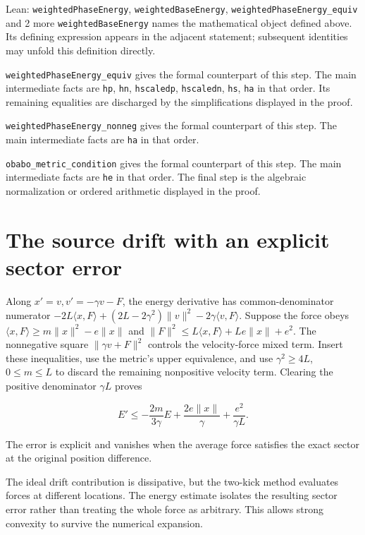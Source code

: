 \documentclass[11pt,a4paper]{article}
\begin{document}
\begin{leanbox}{Lean: \texttt{weightedPhaseEnergy}, \texttt{weightedBaseEnergy}, \texttt{weightedPhaseEnergy\_\allowbreak{}equiv} and 2 more}
\texttt{weighted\allowbreak{}Base\allowbreak{}Energy} names the mathematical object defined above. Its defining expression appears in the adjacent statement; subsequent identities may unfold this definition directly.




\texttt{weighted\allowbreak{}Phase\allowbreak{}Energy\_\allowbreak{}equiv} gives the formal counterpart of this step. The main intermediate facts are \texttt{hp}, \texttt{hn}, \texttt{hscaledp}, \texttt{hscaledn}, \texttt{hs}, \texttt{ha} in that order. Its remaining equalities are discharged by the simplifications displayed in the proof.




\texttt{weighted\allowbreak{}Phase\allowbreak{}Energy\_\allowbreak{}nonneg} gives the formal counterpart of this step. The main intermediate facts are \texttt{ha} in that order.




\texttt{obabo\_\allowbreak{}metric\_\allowbreak{}condition} gives the formal counterpart of this step. The main intermediate facts are \texttt{he} in that order. The final step is the algebraic normalization or ordered arithmetic displayed in the proof.
\end{leanbox}

\section{\texorpdfstring{The source drift with an explicit sector error}{The source drift with an explicit sector error}}


Along \(x'=v,v'=-\gamma v-F\), the energy derivative has common-denominator numerator \(-2L\langle x,F\rangle+(2L-2\gamma^2)\|v\|^2-2\gamma\langle v,F\rangle\). Suppose the force obeys \(\langle x,F\rangle\ge m\|x\|^2-e\|x\|\) and \(\|F\|^2\le L\langle x,F\rangle+Le\|x\|+e^2\). The nonnegative square \(\|\gamma v+F\|^2\) controls the velocity-force mixed term. Insert these inequalities, use the metric's upper equivalence, and use \(\gamma^2\ge4L\), \(0\le m\le L\) to discard the remaining nonpositive velocity term. Clearing the positive denominator \(\gamma L\) proves

\[E'\le-\frac{2m}{3\gamma}E+\frac{2e\|x\|}{\gamma}+\frac{e^2}{\gamma L}.\]

The error is explicit and vanishes when the average force satisfies the exact sector at the original position difference.



The ideal drift contribution is dissipative, but the two-kick method evaluates forces at different locations. The energy estimate isolates the resulting sector error rather than treating the whole force as arbitrary. This allows strong convexity to survive the numerical expansion.
\end{document}
